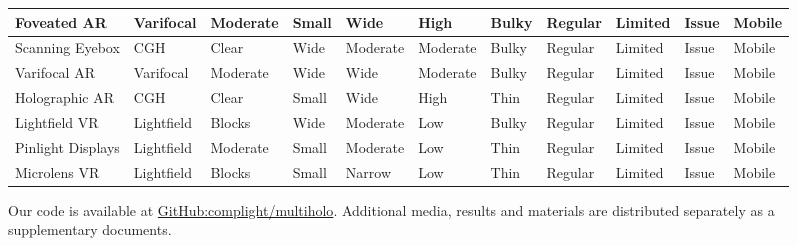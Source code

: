 \documentclass{vgtc}                          %
\makeatletter
\newcommand{\codebase}{\textcolor{blue}{\href{https://github.com/complight/multiholo}{GitHub:complight/multiholo}}\@\xspace}
\newcommand{\high}[1]{{\cellcolor{green!25} #1}}
\newcommand{\medium}[1]{\cellcolor{yellow!25} #1}
\newcommand{\low}[1]{\cellcolor{red!25} #1}
\makeatother
\begin{document}
\begin{table*}[ht!]
\begin{tabular}{m{2.9cm} m{1.2cm} m{1.0cm} m{0.6cm} m{1.0cm} m{1.0cm} m{1.43cm} m{0.82cm} m{1.3cm} m{1.1cm} m{0.8cm}}
	  Foveated AR \cite{kim2019foveated} & 
	  \high{Varifocal} & 
	  \medium{Moderate} & 
	  \low{Small} &
	  \high{Wide} & 
	  \high{High} & 
	  \low{Bulky} & 
	  \low{Regular} & 
	  \low{Limited} & 
	  \low{Issue} &
	  \high{Mobile}
	  \\ \hline


          Scanning Eyebox \cite{jang2018holographic} & 
	  \high{CGH} & 
	  \high{Clear} & 
	  \high{Wide} & 
	  \medium{Moderate} &
	  \medium{Moderate} & 
	  \low{Bulky} & 
	  \low{Regular} & 
	  \low{Limited} & 
	  \low{Issue} &
	  \high{Mobile}
	  \\ \hline



	  Varifocal AR \cite{akcsit2017near}& 
	  \high{Varifocal} & 
	  \medium{Moderate} & 
	  \high{Wide} &
	  \high{Wide} & 
	  \medium{Moderate} & 
	  \low{Bulky} & 
	  \low{Regular} & 
	  \low{Limited} & 
	  \low{Issue} &
	  \high{Mobile}
	  \\ \hline


	  Holographic AR \cite{maimone2017holographic} & 
	  \high{CGH} & 
	  \high{Clear} & 
	  \low{Small} &
	  \high{Wide} & 
	  \high{High} & 
	  \medium{Thin} & 
	  \low{Regular} & 
	  \low{Limited} & 
	  \low{Issue} &
	  \high{Mobile}
	  \\ \hline


          Lightfield VR \cite{huang2015light} & 
	  \high{Lightfield} & 
          \low{Blocks} & 
          \high{Wide} &
	  \medium{Moderate} & 
	  \low{Low} & 
	  \low{Bulky} & 
	  \low{Regular} & 
	  \low{Limited} & 
	  \low{Issue} &
	  \high{Mobile}
	  \\ \hline


          Pinlight Displays \cite{maimone2014pinlight} & 
	  \high{Lightfield} & 
          \medium{Moderate} & 
          \low{Small} &
	  \medium{Moderate} & 
	  \low{Low} & 
	  \medium{Thin} & 
	  \low{Regular} & 
	  \low{Limited} & 
	  \low{Issue} &
	  \high{Mobile}
	  \\ \hline


          Microlens VR \cite{lanman2013near} & 
	  \high{Lightfield} & 
          \low{Blocks} & 
          \low{Small} &
	  \low{Narrow} & 
	  \low{Low} & 
	  \medium{Thin} & 
	  \low{Regular} & 
	  \low{Limited} & 
	  \low{Issue} &
	  \high{Mobile}
	  \\


    \bottomrule
  \end{tabular}
\vspace{-3mm}
\end{table*}


Our code  is available at \codebase.
Additional media, results and materials are distributed separately as a supplementary documents.





\end{document}
